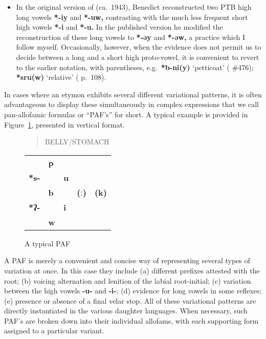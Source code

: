 \begin{itemize}
\item In the original version of \textit{} (ca.~1943), Benedict reconstructed two PTB high
long vowels \textbf{*-iy} and \textbf{*-uw,} contrasting with the much less frequent short high
vowels \textbf{*-i} and \textbf{*-u.}  In the published version \citeyearpar{STC} he modified the
reconstruction of these long vowels to \textbf{*-əy} and \textbf{*-əw,} a practice which I follow
myself. Occasionally, however, when the evidence does not permit us to decide
between a long and a short high proto-vowel, it is convenient to revert to the
earlier notation, with parentheses, e.g.\ \textbf{*b-ni(y)} ‘petticoat’ (\textit{} \#476);
\textbf{*sru(w)} ‘relative’ (\textit{} p.~108).
\end{itemize}

In cases where an etymon exhibits several different variational patterns, it is often advantageous to display these simultaneously
in complex expressions that we call pan-allofamic formulas or “PAF’s” for short. A typical example is provided in
Figure~\ref{fig:typical_PAF}, presented in vertical format.

\begin{figure}[h!]
\begin{quote}BELLY/STOMACH\end{quote}
\begin{center}
\begin{tabular}{l l l l l}
 & \textbf{p} \\
\textbf{*s-} & & \textbf{u} \\
 & \textbf{b} & & \textbf{(ː)} & \textbf{(k)} \\
\textbf{*ʔ-} & & \textbf{i} \\	
 & \textbf{w} \\
\end{tabular}
\caption{A typical PAF}
\label{fig:typical_PAF}
\end{center}
\end{figure}

A PAF is merely a convenient and concise way of representing several types of variation at once. In this case they include (a) different prefixes attested with the root; (b) voicing alternation and lenition of the labial root-initial; (c) variation between the high vowels \textbf{-u-} and \textbf{-i-}; (d) evidence for long vowels in some reflexes; (e) presence or absence of a final velar stop. All of these variational patterns are directly instantiated in the various daughter languages. When necessary, such PAF’s are broken down into their individual allofams, with each supporting form assigned to a particular variant.

